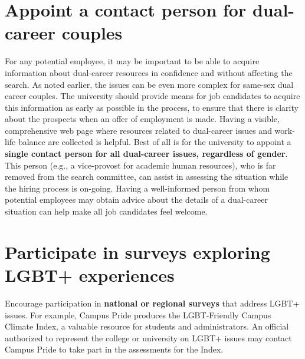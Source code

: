 \section {Appoint a contact person for dual-career couples}
\label{dual-career-contact}
For any potential employee, it may be important to be able to acquire information about dual-career resources in confidence and without affecting the search.  As noted earlier, the issues can be even more complex for same-sex dual career couples. The university should provide means for job candidates to acquire this information as early as possible in the process, to ensure that there is clarity about the prospects when an offer of employment is made.  Having a visible, comprehensive web page where resources related to dual-career issues and work-life balance are collected is helpful.  Best of all is for the university to appoint a \textbf{single contact person for all dual-career issues, regardless of gender}. This person (e.g., a vice-provost for academic human resources), who is far removed from the search committee, can assist in assessing the situation while the hiring process is on-going.  Having a well-informed person from whom potential employees may obtain advice about the details of a dual-career situation can help make all job candidates feel welcome.


\section {Participate in surveys exploring LGBT+ experiences}
\label{univ-surveys}
Encourage participation in \textbf{national or regional surveys} that address LGBT+ issues. For example, Campus Pride produces the LGBT-Friendly Campus Climate Index, a valuable resource for students and administrators. An official authorized to represent the college or university on LGBT+ issues may contact Campus Pride to take part in the assessments for the Index.


















